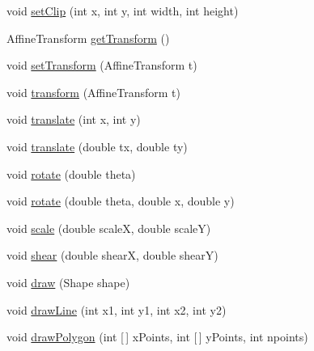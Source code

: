 \begin{DoxyCompactItemize}
\item 
void \mbox{\hyperlink{classorg_1_1jfree_1_1experimental_1_1swt_1_1_s_w_t_graphics2_d_a2feaeaedd4a4c3dac3f9039d516e486c}{set\+Clip}} (int x, int y, int width, int height)
\item 
Affine\+Transform \mbox{\hyperlink{classorg_1_1jfree_1_1experimental_1_1swt_1_1_s_w_t_graphics2_d_a894ffd588ccacb2e0f62ca4c72b4ad66}{get\+Transform}} ()
\item 
void \mbox{\hyperlink{classorg_1_1jfree_1_1experimental_1_1swt_1_1_s_w_t_graphics2_d_a08e83ee8a8eff2b35fa53a33254652f3}{set\+Transform}} (Affine\+Transform t)
\item 
void \mbox{\hyperlink{classorg_1_1jfree_1_1experimental_1_1swt_1_1_s_w_t_graphics2_d_a9dd1071f660b414c9065602844554e14}{transform}} (Affine\+Transform t)
\item 
void \mbox{\hyperlink{classorg_1_1jfree_1_1experimental_1_1swt_1_1_s_w_t_graphics2_d_aca8e0a98f94eac04c604500baef9b56d}{translate}} (int x, int y)
\item 
void \mbox{\hyperlink{classorg_1_1jfree_1_1experimental_1_1swt_1_1_s_w_t_graphics2_d_ab7fc89e3d0f7190a653a2a71290900f2}{translate}} (double tx, double ty)
\item 
void \mbox{\hyperlink{classorg_1_1jfree_1_1experimental_1_1swt_1_1_s_w_t_graphics2_d_a4baf90b6d68a27bb46793f52ef913e7d}{rotate}} (double theta)
\item 
void \mbox{\hyperlink{classorg_1_1jfree_1_1experimental_1_1swt_1_1_s_w_t_graphics2_d_aa7d0a9b2a8c7ee84fe8ef7bc8d5686cd}{rotate}} (double theta, double x, double y)
\item 
void \mbox{\hyperlink{classorg_1_1jfree_1_1experimental_1_1swt_1_1_s_w_t_graphics2_d_a0f26fdcbd25ecaaf55d0aad6dbdb770f}{scale}} (double scaleX, double scaleY)
\item 
void \mbox{\hyperlink{classorg_1_1jfree_1_1experimental_1_1swt_1_1_s_w_t_graphics2_d_aa85fd01e6e7455415312d1a8e9b3ea6d}{shear}} (double shearX, double shearY)
\item 
void \mbox{\hyperlink{classorg_1_1jfree_1_1experimental_1_1swt_1_1_s_w_t_graphics2_d_a37f194899d6d51e6c4e9d81699e0e4f5}{draw}} (Shape shape)
\item 
void \mbox{\hyperlink{classorg_1_1jfree_1_1experimental_1_1swt_1_1_s_w_t_graphics2_d_a5e9ebd649141ab8c6e20f2a4a0c60c16}{draw\+Line}} (int x1, int y1, int x2, int y2)
\item 
void \mbox{\hyperlink{classorg_1_1jfree_1_1experimental_1_1swt_1_1_s_w_t_graphics2_d_a48d9bf99dafef8b93b3eb889157242f7}{draw\+Polygon}} (int \mbox{[}$\,$\mbox{]} x\+Points, int \mbox{[}$\,$\mbox{]} y\+Points, int npoints)

\end{DoxyCompactItemize}
